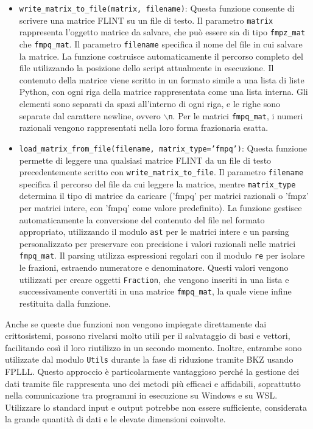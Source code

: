 \begin{itemize}
    \item \texttt{write\_matrix\_to\_file(matrix, filename)}: 
    Questa funzione consente di scrivere una matrice FLINT su un file di testo.
    Il parametro \texttt{matrix} rappresenta l'oggetto matrice da salvare, che può
    essere sia di tipo \texttt{fmpz\_mat} che \texttt{fmpq\_mat}. 
    Il parametro \texttt{filename} specifica il nome del file
    in cui salvare la matrice. La funzione costruisce automaticamente il percorso
    completo del file utilizzando la posizione dello script attualmente in esecuzione. Il contenuto
    della matrice viene scritto in un formato simile a una lista di liste Python,
    con ogni riga della matrice rappresentata come una lista interna. Gli elementi
    sono separati da spazi all'interno di ogni riga, e le righe sono separate dal
    carattere newline, ovvero \texttt{$\backslash$n}. Per le matrici \texttt{fmpq\_mat}, i
     numeri razionali
    vengono rappresentati nella loro forma frazionaria esatta.
    \item \texttt{load\_matrix\_from\_file(filename, matrix\_type='fmpq')}: 
    Questa funzione permette di leggere una qualsiasi matrice FLINT da un file di testo 
    precedentemente scritto con \texttt{write\_matrix\_to\_file}. 
    Il parametro \texttt{filename} specifica il percorso del file da cui leggere la matrice,
    mentre \texttt{matrix\_type} determina il tipo di matrice da caricare 
    ('fmpq' per matrici razionali o 'fmpz' per matrici intere, con 'fmpq' come valore 
    predefinito). La funzione
    gestisce automaticamente la conversione del contenuto del file nel formato appropriato,
    utilizzando il modulo \texttt{ast} per le matrici intere e un parsing personalizzato
    per preservare con precisione i valori razionali nelle matrici \texttt{fmpq\_mat}.
    Il parsing utilizza espressioni regolari con il modulo \texttt{re} per isolare le frazioni, 
    estraendo numeratore e denominatore. Questi valori vengono utilizzati per creare 
    oggetti \texttt{Fraction}, che vengono inseriti in una lista e successivamente convertiti 
    in una matrice \texttt{fmpq\_mat}, la quale viene infine restituita dalla funzione.
    
\end{itemize}
Anche se queste due funzioni non vengono impiegate direttamente dai crittosistemi, 
possono rivelarsi molto utili per il salvataggio di basi e vettori, facilitando così il 
loro riutilizzo in un secondo momento. Inoltre, entrambe sono utilizzate dal modulo 
\texttt{Utils} durante la fase di riduzione tramite BKZ usando FPLLL. Questo approccio è particolarmente 
vantaggioso perché la gestione dei dati tramite file rappresenta uno dei metodi più 
efficaci e affidabili, soprattutto nella comunicazione tra programmi in esecuzione su Windows e su
WSL. Utilizzare lo standard input e output potrebbe non essere 
sufficiente, considerata la grande quantità di dati e le elevate dimensioni coinvolte.
